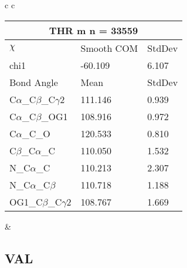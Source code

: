 \begin{longtable}{ c c }
\begin{tabular}{ l l l }
  \toprule
  \multicolumn{3}{c}{THR \textbf{m} n = 33559} \\ \toprule
  $\chi$       & Smooth COM & StdDev \\ \midrule
  chi1 & -60.109 & 6.107 \\ \midrule
  Bond Angle   & Mean     & StdDev \\ \midrule
  C$\alpha$\_C$\beta$\_C$\gamma$2 & 111.146 & 0.939\\
  C$\alpha$\_C$\beta$\_OG1 & 108.916 & 0.972\\
  C$\alpha$\_C\_O & 120.533 & 0.810\\
  C$\beta$\_C$\alpha$\_C & 110.050 & 1.532\\
  N\_C$\alpha$\_C & 110.213 & 2.307\\
  N\_C$\alpha$\_C$\beta$ & 110.718 & 1.188\\
  OG1\_C$\beta$\_C$\gamma$2 & 108.767 & 1.669\\
  \bottomrule
  \end{tabular}
  &
  \\
  
\end{longtable}    

\newpage
\subsection{VAL}

